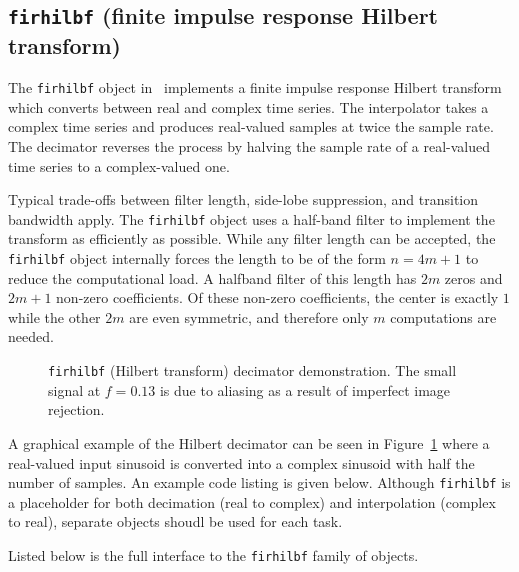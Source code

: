 % 
%
\subsection{{\tt firhilbf} (finite impulse response Hilbert transform)}
\label{module:filter:firhilb}
The {\tt firhilbf} object in \liquid\ implements a finite impulse
response Hilbert transform which
converts between real and complex time series.
The interpolator takes a complex time series and produces real-valued
samples at twice the sample rate.
The decimator reverses the process by halving the sample rate of a
real-valued time series to a complex-valued one.

Typical trade-offs between filter length, side-lobe suppression, and
transition bandwidth apply.
The {\tt firhilbf} object uses a half-band filter to implement the
transform as efficiently as possible.
While any filter length can be accepted, the {\tt firhilbf} object
internally forces the length to be of the form $n=4m+1$
to reduce the computational load.
A halfband filter of this length has $2m$ zeros and $2m+1$ non-zero
coefficients.
Of these non-zero coefficients, the center is exactly $1$ while the other $2m$
are even symmetric, and therefore only $m$ computations are needed.
%
\begin{figure}
\centering
{}
\caption{{\tt firhilbf} (Hilbert transform) decimator demonstration.
         The small signal at $f=0.13$ is due to aliasing as a result of
         imperfect image rejection.}
\label{fig:module:filter:firhilb}
\end{figure}
%
A graphical example of the Hilbert decimator can be seen in
Figure~\ref{fig:module:filter:firhilb}
where a real-valued input sinusoid is converted into a complex sinusoid
with half the number of samples.
%
An example code listing is given below.
Although {\tt firhilbf} is a placeholder for both
decimation (real to complex) and
interpolation (complex to real),
separate objects shoudl be used for each task.
%

%
Listed below is the full interface to the {\tt firhilbf} family of
objects.
%

